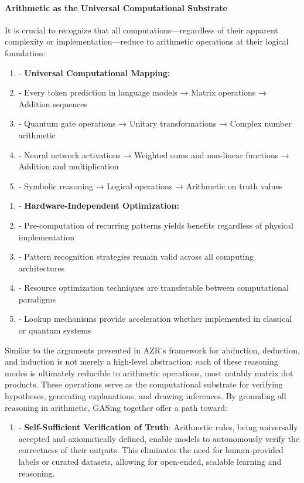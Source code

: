 \documentclass[11pt,a4paper]{article}
\begin{document}
\paragraph{Arithmetic as the Universal Computational Substrate}
It is crucial to recognize that all computations—regardless of their apparent complexity or implementation—reduce to arithmetic operations at their logical foundation:

\begin{enumerate}
  \item - \textbf{Universal Computational Mapping:}
  \item - Every token prediction in language models → Matrix operations → Addition sequences
  \item - Quantum gate operations → Unitary transformations → Complex number arithmetic
  \item - Neural network activations → Weighted sums and non-linear functions → Addition and multiplication
  \item - Symbolic reasoning → Logical operations → Arithmetic on truth values
\end{enumerate}

\begin{enumerate}
  \item - \textbf{Hardware-Independent Optimization:}
  \item - Pre-computation of recurring patterns yields benefits regardless of physical implementation
  \item - Pattern recognition strategies remain valid across all computing architectures
  \item - Resource optimization techniques are transferable between computational paradigms
  \item - Lookup mechanisms provide acceleration whether implemented in classical or quantum systems
\end{enumerate}

Similar to the arguments presented in AZR's framework for abduction, deduction, and induction is not merely a high-level abstraction; each of these reasoning modes is ultimately reducible to arithmetic operations, most notably matrix dot products. These operations serve as the computational substrate for verifying hypotheses, generating explanations, and drawing inferences. By grounding all reasoning in arithmetic, GASing together offer a path toward:

\begin{enumerate}
  \item - \textbf{Self-Sufficient Verification of Truth}: Arithmetic rules, being universally accepted and axiomatically defined, enable models to autonomously verify the correctness of their outputs. This eliminates the need for human-provided labels or curated datasets, allowing for open-ended, scalable learning and reasoning.
\end{enumerate}
\end{document}
